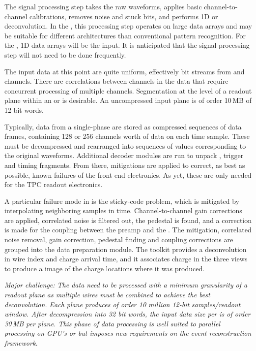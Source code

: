 \documentclass[../main-v1.tex]{subfiles}
\begin{document}
The signal processing step takes the raw waveforms, applies  basic channel-to-channel calibrations, removes noise and stuck bits, and performs 1D or \twod deconvolution.   In the , this processing step operates on large \twod data arrays and may be suitable for different architectures than conventional pattern recognition. For the , 1D data arrays will be the input. It is anticipated that the signal processing step will not need to be done frequently. 

The input data at this point are quite uniform, effectively bit streams from  and  channels.  There are correlations between channels in the  data that require concurrent processing of multiple channels.  Segmentation at the level of a readout plane within an   or  is desirable.  An uncompressed input  plane is of order 10\,MB of 12-bit words. 



Typically, data from a single-phase   are stored as compressed sequences of data frames, containing 128 or 256 channels worth of data on each time sample.  These must be decompressed and rearranged into sequences of  values corresponding to the original waveforms.  Additional decoder modules are run to unpack ,  trigger and timing  fragments.
From there, mitigations are applied to correct, as best as possible, known failures of the front-end electronics.  As yet, these are only needed for the TPC readout electronics.  

A particular failure mode in  is the sticky-code problem, which is mitigated by interpolating neighboring  samples in time.  Channel-to-channel gain corrections are applied, correlated noise is filtered out, the pedestal is found, and a correction is made for the  coupling between the preamp and the .  The  mitigation, correlated noise removal, gain correction, pedestal finding and  coupling corrections are grouped into the data preparation module.  The  toolkit provides a \twod deconvolution in wire index and charge arrival time, and it associates charge in the three views to produce a \threed image of the charge locations where it was produced.  

{\it Major challenge: The  data need to be processed with a minimum granularity of a readout plane as multiple wires must be combined to achieve the best \twod deconvolution.  Each plane produces of order 10 million 12-bit samples/readout window. After decompression into 32 bit words, the input data size %
per  is of order 30\,MB per plane. This phase of data processing is well suited to parallel processing on GPU's or  but imposes new requirements on the event reconstruction framework. }
\end{document}
